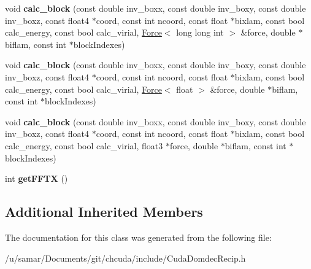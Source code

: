 \begin{DoxyCompactItemize}
\item 
\hypertarget{classCudaDomdecRecip_a939aa363b653daa73d94d2bcfa015afe}{}\label{classCudaDomdecRecip_a939aa363b653daa73d94d2bcfa015afe} 
void {\bfseries calc\+\_\+block} (const double inv\+\_\+boxx, const double inv\+\_\+boxy, const double inv\+\_\+boxz, const float4 $\ast$coord, const int ncoord, const float $\ast$bixlam, const bool calc\+\_\+energy, const bool calc\+\_\+virial, \hyperlink{classForce}{Force}$<$ long long int $>$ \&force, double $\ast$biflam, const int $\ast$block\+Indexes)
\item 
\hypertarget{classCudaDomdecRecip_a9a81a01ef5d6385329c13423412c6e0a}{}\label{classCudaDomdecRecip_a9a81a01ef5d6385329c13423412c6e0a} 
void {\bfseries calc\+\_\+block} (const double inv\+\_\+boxx, const double inv\+\_\+boxy, const double inv\+\_\+boxz, const float4 $\ast$coord, const int ncoord, const float $\ast$bixlam, const bool calc\+\_\+energy, const bool calc\+\_\+virial, \hyperlink{classForce}{Force}$<$ float $>$ \&force, double $\ast$biflam, const int $\ast$block\+Indexes)
\item 
\hypertarget{classCudaDomdecRecip_a09d3f40535886d3c153a332e9c669d81}{}\label{classCudaDomdecRecip_a09d3f40535886d3c153a332e9c669d81} 
void {\bfseries calc\+\_\+block} (const double inv\+\_\+boxx, const double inv\+\_\+boxy, const double inv\+\_\+boxz, const float4 $\ast$coord, const int ncoord, const float $\ast$bixlam, const bool calc\+\_\+energy, const bool calc\+\_\+virial, float3 $\ast$force, double $\ast$biflam, const int $\ast$block\+Indexes)
\item 
\hypertarget{classCudaDomdecRecip_a0a695ab739249c06fa47033638efae3b}{}\label{classCudaDomdecRecip_a0a695ab739249c06fa47033638efae3b} 
int {\bfseries get\+F\+F\+TX} ()
\end{DoxyCompactItemize}
\subsection*{Additional Inherited Members}


The documentation for this class was generated from the following file\+:\begin{DoxyCompactItemize}
\item 
/u/samar/\+Documents/git/chcuda/include/Cuda\+Domdec\+Recip.\+h\end{DoxyCompactItemize}

